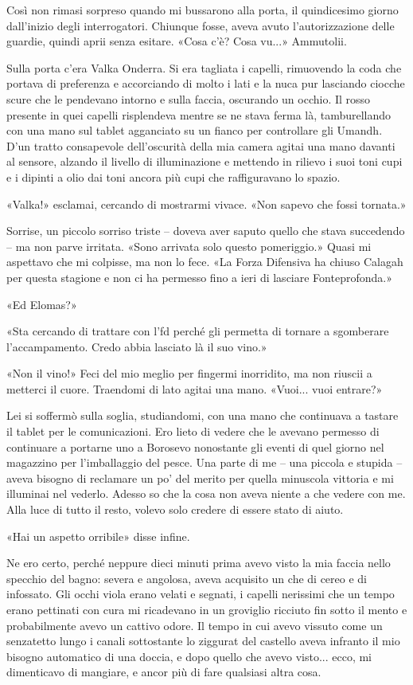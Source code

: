 Così non rimasi sorpreso quando mi bussarono alla porta, il quindicesimo
giorno dall'inizio degli interrogatori. Chiunque fosse, aveva avuto
l'autorizzazione delle guardie, quindi aprii senza esitare. «Cosa c'è?
Cosa vu...» Ammutolii.

Sulla porta c'era Valka Onderra. Si era tagliata i capelli, rimuovendo
la coda che portava di preferenza e accorciando di molto i lati e la
nuca pur lasciando ciocche scure che le pendevano intorno e sulla
faccia, oscurando un occhio. Il rosso presente in quei capelli
risplendeva mentre se ne stava ferma là, tamburellando con una mano sul
tablet agganciato su un fianco per controllare gli Umandh. D'un tratto
consapevole dell'oscurità della mia camera agitai una mano davanti al
sensore, alzando il livello di illuminazione e mettendo in rilievo i
suoi toni cupi e i dipinti a olio dai toni ancora più cupi che
raffiguravano lo spazio.

«Valka!» esclamai, cercando di mostrarmi vivace. «Non sapevo che fossi
tornata.»

Sorrise, un piccolo sorriso triste -- doveva aver saputo quello che
stava succedendo -- ma non parve irritata. «Sono arrivata solo questo
pomeriggio.» Quasi mi aspettavo che mi colpisse, ma non lo fece. «La
Forza Difensiva ha chiuso Calagah per questa stagione e non ci ha
permesso fino a ieri di lasciare Fonteprofonda.»

«Ed Elomas?»

«Sta cercando di trattare con l'\foreignlanguage{italian}{fd} perché gli
permetta di tornare a sgomberare l'accampamento. Credo abbia lasciato là
il suo vino.»

«Non il vino!» Feci del mio meglio per fingermi inorridito, ma non
riuscii a metterci il cuore. Traendomi di lato agitai una mano. «Vuoi...
vuoi entrare?»

Lei si soffermò sulla soglia, studiandomi, con una mano che continuava a
tastare il tablet per le comunicazioni. Ero lieto di vedere che le
avevano permesso di continuare a portarne uno a Borosevo nonostante gli
eventi di quel giorno nel magazzino per l'imballaggio del pesce. Una
parte di me -- una piccola e stupida -- aveva bisogno di reclamare un
po' del merito per quella minuscola vittoria e mi illuminai nel vederlo.
Adesso so che la cosa non aveva niente a che vedere con me. Alla luce di
tutto il resto, volevo solo credere di essere stato di aiuto.

«Hai un aspetto orribile» disse infine.

Ne ero certo, perché neppure dieci minuti prima avevo visto la mia
faccia nello specchio del bagno: severa e angolosa, aveva acquisito un
che di cereo e di infossato. Gli occhi viola erano velati e segnati, i
capelli nerissimi che un tempo erano pettinati con cura mi ricadevano in
un groviglio ricciuto fin sotto il mento e probabilmente avevo un
cattivo odore. Il tempo in cui avevo vissuto come un senzatetto lungo i
canali sottostante lo ziggurat del castello aveva infranto il mio
bisogno automatico di una doccia, e dopo quello che avevo visto... ecco,
mi dimenticavo di mangiare, e ancor più di fare qualsiasi altra cosa.

